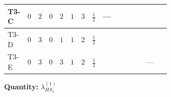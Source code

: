\documentclass[8pt]{article}
\begin{document}
\begin{landscape}
\begin{longtable}{@{}llcccccc >{\raggedright\arraybackslash}p{0.21\linewidth} >{\raggedright\arraybackslash}p{0.21\linewidth} >{\raggedright\arraybackslash}p{0.21\linewidth}@{}}
\midrule
T3-C & $0$ & $2$ & $0$ & $2$ & $1$ & $3$ & $\frac{1}{2}$ & --- & \scriptsize\adjustbox{max width=\linewidth}{$\begin{gathered} -\frac{3 {g_1}^2 {\lambda_{HS_1}^{(1)}}}{2}\end{gathered}$} & \scriptsize\adjustbox{max width=\linewidth}{$\begin{gathered} +4 {\lambda_{12}^{(1)}} {\lambda_{HS_2}^{(1)}}\end{gathered}$} \\
\midrule
T3-D & $0$ & $3$ & $0$ & $1$ & $1$ & $2$ & $\frac{1}{2}$ & \scriptsize\adjustbox{max width=\linewidth}{$\begin{gathered} -\frac{33 {g_2}^2 {\lambda_{HS_1}^{(1)}}}{2}\end{gathered}$} & \scriptsize\adjustbox{max width=\linewidth}{$\begin{gathered} -\frac{3 {g_1}^2 {\lambda_{HS_1}^{(1)}}}{2}\end{gathered}$} & \scriptsize\adjustbox{max width=\linewidth}{$\begin{gathered} +2 {\lambda_{12}^{(1)}} {\lambda_{HS_2}^{(1)}}\end{gathered}$} \\
\midrule
T3-E & $0$ & $3$ & $0$ & $3$ & $1$ & $2$ & $\frac{1}{2}$ & \scriptsize\adjustbox{max width=\linewidth}{$\begin{gathered} -\frac{33 {g_2}^2 {\lambda_{HS_1}^{(1)}}}{2}\end{gathered}$} & \scriptsize\adjustbox{max width=\linewidth}{$\begin{gathered} -\frac{3 {g_1}^2 {\lambda_{HS_1}^{(1)}}}{2}\end{gathered}$} & --- \\
\midrule
\bottomrule
\end{longtable}
\clearpage
\noindent\textbf{Quantity: }$\lambda_{HS_1}^{(1)}$\par\smallskip

\end{landscape}
\end{document}
